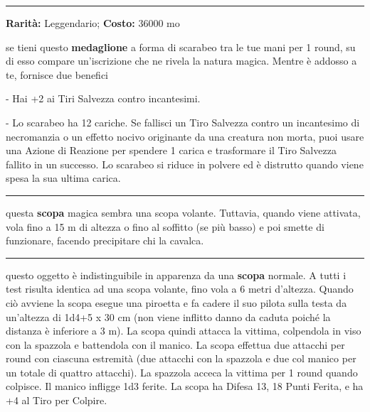 \begin{multicols}{2}
\smallskip\noindent\rule{\linewidth}{2pt}  \hypertarget{ScarabeodiProtezione}{}\medskip{}\noindent\label{ScarabeodiProtezione}

\textbf{Rarità:} Leggendario; \textbf{Costo:} 36000 mo

se tieni questo \textbf{medaglione} a forma di scarabeo tra le tue mani per 1 round, su di esso compare un'iscrizione che ne rivela la natura magica. Mentre è addosso a te, fornisce due benefici

- Hai +2 ai Tiri Salvezza contro incantesimi.

- Lo scarabeo ha 12 cariche. Se fallisci un Tiro Salvezza contro un incantesimo di necromanzia o un effetto nocivo originante da una creatura non morta, puoi usare una Azione di Reazione per spendere 1 carica e trasformare il Tiro Salvezza fallito in un successo. Lo scarabeo si riduce in polvere ed è distrutto quando viene spesa la sua ultima carica.

\smallskip\noindent\rule{\linewidth}{2pt}  \hypertarget{ScopadelVolomaledetto}{}\medskip{}\noindent\label{ScopadelVolomaledetto}

questa \textbf{scopa} magica sembra una scopa volante. Tuttavia, quando viene attivata, vola fino a 15 m di altezza o fino al soffitto (se più basso) e poi smette di funzionare, facendo precipitare chi la cavalca.

\smallskip\noindent\rule{\linewidth}{2pt}  \hypertarget{Scopadell'Attaccoanimato}{}\medskip{}\noindent\label{Scopadell'Attaccoanimato}

questo oggetto è indistinguibile in apparenza da una \textbf{scopa} normale. A tutti i test risulta identica ad una scopa volante, fino vola a 6 metri d'altezza. Quando ciò avviene la scopa esegue una piroetta e fa cadere il suo pilota sulla testa da un'altezza di 1d4+5 x 30 cm (non viene inflitto danno da caduta poiché la distanza è inferiore a 3 m). La scopa quindi attacca la vittima, colpendola in viso con la spazzola e battendola con il manico. La scopa effettua due attacchi per round con ciascuna estremità (due attacchi con la spazzola e due col manico per un totale di quattro attacchi). La spazzola acceca la vittima per 1 round quando colpisce. Il manico infligge 1d3 ferite. La scopa ha Difesa 13, 18 Punti Ferita, e ha +4 al Tiro per Colpire.


\end{multicols}
